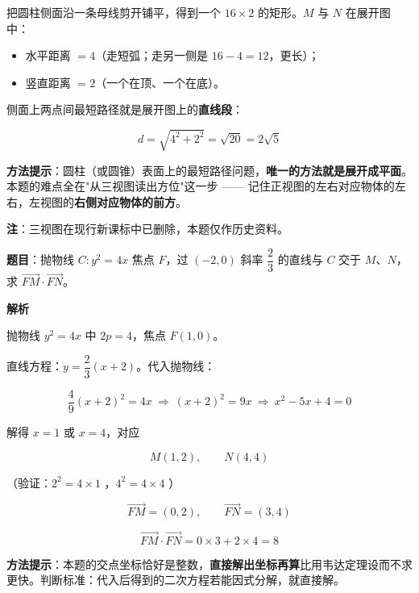 把圆柱侧面沿一条母线剪开铺平，得到一个 $16\times2$ 的矩形。$M$ 与 $N$ 在展开图中：

\begin{itemize}
\item 水平距离 $=4$（走短弧；走另一侧是 $16-4=12$，更长）；
\item 竖直距离 $=2$（一个在顶、一个在底）。
\end{itemize}

侧面上两点间最短路径就是展开图上的\textbf{直线段}：

\[d=\sqrt{4^{2}+2^{2}}=\sqrt{20}=2\sqrt5\]


\begin{gktip}
\textbf{方法提示}：圆柱（或圆锥）表面上的最短路径问题，\textbf{唯一的方法就是展开成平面}。本题的难点全在"从三视图读出方位"这一步 —— 记住正视图的左右对应物体的左右，左视图的\textbf{右侧对应物体的前方}。

\textbf{注}：三视图在现行新课标中已删除，本题仅作历史资料。
\end{gktip}

\par\medskip


\textbf{题目}：抛物线 $C:y^{2}=4x$ 焦点 $F$，过 $(-2,0)$ 斜率 $\dfrac23$ 的直线与 $C$ 交于 $M$、$N$，求 $\overrightarrow{FM}\cdot\overrightarrow{FN}$。

\textbf{解析}

抛物线 $y^{2}=4x$ 中 $2p=4$，焦点 $F(1,0)$。

直线方程：$y=\dfrac23(x+2)$。代入抛物线：

\[\frac49(x+2)^{2}=4x\ \Longrightarrow\ (x+2)^{2}=9x\ \Longrightarrow\ x^{2}-5x+4=0\]

解得 $x=1$ 或 $x=4$，对应

\[M(1,2),\qquad N(4,4)\]

（验证：$2^{2}=4\times1$ ，$4^{2}=4\times4$ ）

\[\overrightarrow{FM}=(0,2),\qquad \overrightarrow{FN}=(3,4)\]

\[\overrightarrow{FM}\cdot\overrightarrow{FN}=0\times3+2\times4=8\]


\begin{gktip}
\textbf{方法提示}：本题的交点坐标恰好是整数，\textbf{直接解出坐标再算}比用韦达定理设而不求更快。判断标准：代入后得到的二次方程若能因式分解，就直接解。
\end{gktip}

